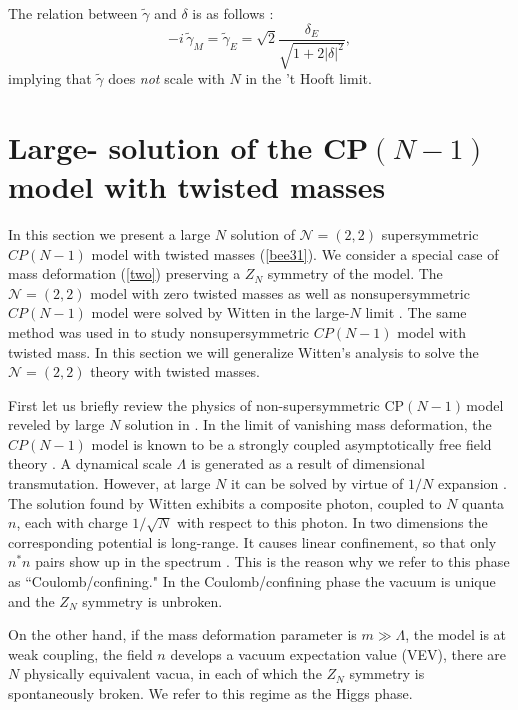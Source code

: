 \documentclass[epsfig,12pt]{article}
\def\beq{\begin{equation}}
\def\eeq{\end{equation}}
\newcommand{\cpn}{CP$(N-1)\,$}
\def\beq{\begin{equation}}
\def\eeq{\end{equation}}
\newcommand{\ntwot}{${\mathcal N}= \left(2,2\right) $ }
\begin{document}
The relation between $\tilde\gamma$ and $\delta$
is as follows \cite{BSY3}:
\beq
-i\,\tilde\gamma_M=\tilde\gamma_E = \sqrt{2} \frac{\delta_E}{\sqrt{1+ 2 |\delta |^2}},
\label{tftpi4}
\eeq
implying that $\tilde \gamma$ does {\em not} scale with $N$ in the 't Hooft limit.




\section{Large- solution
of the \cpn model with twisted masses}
\setcounter{equation}{0}






In this section we present a large $N$ solution of \ntwot supersymmetric $CP(N-1)$ model 
with twisted masses (\ref{bee31}). We consider a special case of mass deformation
(\ref{two}) 
preserving a $Z_N$
symmetry of the model. 
The \ntwot  model with zero twisted masses as well as nonsupersymmetric $CP(N-1)$ model
were solved by Witten in the large-$N$ limit \cite{W79}.
The same method was used in
\cite{GSYphtr} to study nonsupersymmetric $CP(N-1)$ model with twisted mass. In this section we will generalize Witten's analysis 
to solve the \ntwot theory with twisted masses. 

First let us briefly review the physics of non-supersymmetric \cpn model reveled
by large $N$ solution in \cite{GSYphtr}.
In the limit of vanishing mass deformation, the
$CP(N-1)$ model is known to be a strongly coupled asymptotically free
field theory
\cite{P75}. A dynamical scale $\Lambda$ is generated as a result of
dimensional transmutation.
However, at large $N$ it can be solved by virtue of $1/N$ expansion
\cite{W79}.
The solution found by Witten exhibits a composite photon,
coupled to $N$ quanta $n$, each with charge $1/\sqrt N$ with respect
to this photon. In two dimensions the corresponding potential is long-range.
It causes linear confinement, so that only $n^*n$ pairs show up in the
spectrum \cite{Coleman,W79}. This is the reason why we refer to this phase as
``Coulomb/confining." In the Coulomb/confining phase the vacuum 
is unique and the $Z_N$ symmetry is unbroken.

On the other hand, if the mass deformation parameter is $m\gg
\Lambda$,
the model is at weak coupling, the field $n$ develops a vacuum
expectation value (VEV),
there are $N$ physically equivalent vacua, in each of which the
$Z_N$ symmetry is spontaneously broken. We  refer to this regime
as the
Higgs phase.
\end{document}
